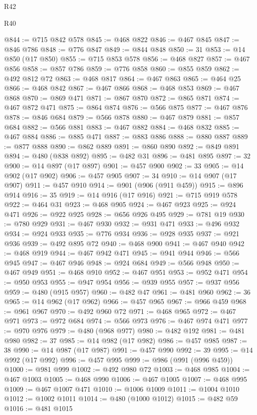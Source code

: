 \begin{lexlean}{R42}
\begin{lexlean}{R40}
\begin{coremodule}
{{{{{{{{{{{{{{{{{{{{{{{{{{{{{{{{{{{{{{{{{{{{{{{{{{{{{{{{{{{{{{{{{{{{{{{{{{{{{{{{{{{{{{{{{{{{{{{{{{{{{{{{{{{{{@844 := @715 @842 @578
@845 := @468 @822
@846 := @467 @845
@847 := @846 @786
@848 := @776 @847
@849 := @844 @848
@850 := 31
@853 := @14 @850 (@17 @850)
@855 := @715 @853 @578
@856 := @468 @827
@857 := @467 @856
@858 := @857 @786
@859 := @776 @858
@860 := @855 @859
@862 := @492 @812 @72
@863 := @468 @817
@864 := @467 @863
@865 := @464 @25
@866 := @468 @842
@867 := @467 @866
@868 := @468 @853
@869 := @467 @868
@870 := @869 @471
@871 := @867 @870
@872 := @865 @871
@874 := @467 @872 @471
@875 := @864 @874
@876 := @566 @875
@877 := @467 @876
@878 := @846 @684
@879 := @566 @878
@880 := @467 @879
@881 := @857 @684
@882 := @566 @881
@883 := @467 @882
@884 := @468 @832
@885 := @467 @884
@886 := @885 @471
@887 := @883 @886
@888 := @880 @887
@889 := @877 @888
@890 := @862 @889
@891 := @860 @890
@892 := @849 @891
@894 := @480 (@838 @892)
@895 := @482 @31
@896 := @481 @895
@897 := 32
@900 := @14 @897 (@17 @897)
@901 := @457 @900
@902 := 33
@905 := @14 @902 (@17 @902)
@906 := @457 @905
@907 := 34
@910 := @14 @907 (@17 @907)
@911 := @457 @910
@914 := @901 (@906 (@911 @459))
@915 := @896 @914
@916 := 35
@919 := @14 @916 (@17 @916)
@921 := @715 @919 @578
@922 := @464 @31
@923 := @468 @905
@924 := @467 @923
@925 := @924 @471
@926 := @922 @925
@928 := @656 @926 @495
@929 := @781 @19
@930 := @780 @929
@931 := @467 @930
@932 := @931 @471
@933 := @496 @932
@934 := @924 @933
@935 := @776 @934
@936 := @928 @935
@937 := @921 @936
@939 := @492 @895 @72
@940 := @468 @900
@941 := @467 @940
@942 := @468 @919
@944 := @467 @942 @471
@945 := @941 @944
@946 := @566 @945
@947 := @467 @946
@948 := @924 @684
@949 := @566 @948
@950 := @467 @949
@951 := @468 @910
@952 := @467 @951
@953 := @952 @471
@954 := @950 @953
@955 := @947 @954
@956 := @939 @955
@957 := @937 @956
@959 := @480 (@915 @957)
@960 := @482 @47
@961 := @481 @960
@962 := 36
@965 := @14 @962 (@17 @962)
@966 := @457 @965
@967 := @966 @459
@968 := @961 @967
@970 := @492 @960 @72
@971 := @468 @965
@972 := @467 @971
@973 := @972 @684
@974 := @566 @973
@976 := @467 @974 @471
@977 := @970 @976
@979 := @480 (@968 @977)
@980 := @482 @192
@981 := @481 @980
@982 := 37
@985 := @14 @982 (@17 @982)
@986 := @457 @985
@987 := 38
@990 := @14 @987 (@17 @987)
@991 := @457 @990
@992 := 39
@995 := @14 @992 (@17 @992)
@996 := @457 @995
@999 := @986 (@991 (@996 @459))
@1000 := @981 @999
@1002 := @492 @980 @72
@1003 := @468 @985
@1004 := @467 @1003
@1005 := @468 @990
@1006 := @467 @1005
@1007 := @468 @995
@1009 := @467 @1007 @471
@1010 := @1006 @1009
@1011 := @1004 @1010
@1012 := @1002 @1011
@1014 := @480 (@1000 @1012)
@1015 := @482 @59
@1016 := @481 @1015
}}}}}}}}}}}}}}}}}}}}}}}}}}}}}}}}}}}}}}}}}}}}}}}}}}}}}}}}}}}}}}}}}}}}}}}}}}}}}}}}}}}}}}}}}}}}}}}}}}}}}}}}}}}}}
\end{coremodule}
\end{lexlean}
\end{lexlean}
